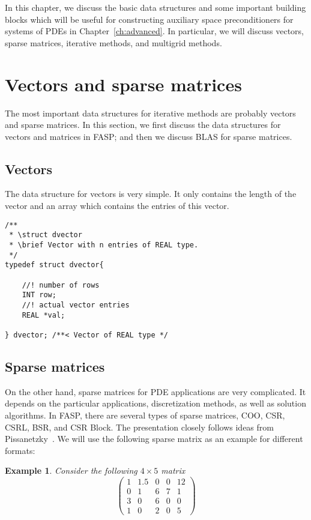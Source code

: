 \documentclass[11pt]{memoir}
\newtheorem{example}[theorem]{Example}
\begin{document}
In this chapter, we discuss the basic data structures and some important building blocks which will be useful for constructing auxiliary space preconditioners for systems of PDEs in Chapter~\ref{ch:advanced}. In particular, we will discuss vectors, sparse matrices, iterative methods, and multigrid methods. 

\section{Vectors and sparse matrices}\label{sec:blas}

The most important data structures for iterative methods are probably vectors and sparse matrices. In this section, we first discuss the data structures for vectors and matrices in FASP; and then we discuss BLAS for sparse matrices. 

\subsection{Vectors}

The data structure for vectors is very simple. It only contains the length of the vector and an array which contains the entries of this vector. 

\begin{lstlisting}
/** 
 * \struct dvector
 * \brief Vector with n entries of REAL type.
 */
typedef struct dvector{
	
    //! number of rows
	INT row;
    //! actual vector entries
	REAL *val;
	
} dvector; /**< Vector of REAL type */
\end{lstlisting}

\subsection{Sparse matrices}

On the other hand, sparse matrices for PDE applications are very complicated. It depends on the particular applications, discretization methods, as well as solution algorithms. In FASP, there are several types of sparse matrices, COO, CSR, CSRL, BSR, and CSR Block. The presentation closely follows ideas from Pissanetzky~\cite{Pissanetzky}. We will use the following sparse matrix as an example for different formats:

\begin{example}\label{ex:sparse}
Consider the following $4\times 5$ matrix 
$$
\left(\begin{array}{ccccc}
1 & 1.5 & 0 & 0 & 12\\
0 & 1    & 6 & 7 & 1\\
3 & 0    & 6 & 0 & 0\\
1 & 0    & 2 & 0 & 5
\end{array}
\right)
$$
\end{example}
\end{document}
